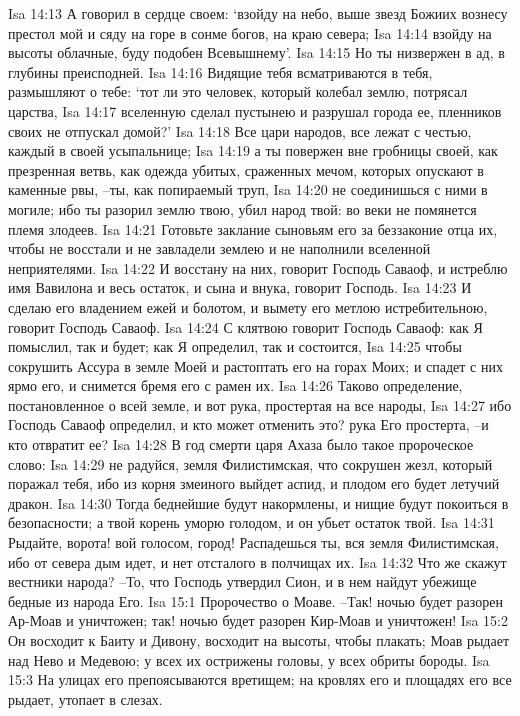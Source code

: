 Isa 14:13  А говорил в сердце своем: `взойду на небо, выше звезд Божиих вознесу престол мой и сяду на горе в сонме богов, на краю севера;
Isa 14:14  взойду на высоты облачные, буду подобен Всевышнему'.
Isa 14:15  Но ты низвержен в ад, в глубины преисподней.
Isa 14:16  Видящие тебя всматриваются в тебя, размышляют о тебе: `тот ли это человек, который колебал землю, потрясал царства,
Isa 14:17  вселенную сделал пустынею и разрушал города ее, пленников своих не отпускал домой?'
Isa 14:18  Все цари народов, все лежат с честью, каждый в своей усыпальнице;
Isa 14:19  а ты повержен вне гробницы своей, как презренная ветвь, как одежда убитых, сраженных мечом, которых опускают в каменные рвы, --ты, как попираемый труп,
Isa 14:20  не соединишься с ними в могиле; ибо ты разорил землю твою, убил народ твой: во веки не помянется племя злодеев.
Isa 14:21  Готовьте заклание сыновьям его за беззаконие отца их, чтобы не восстали и не завладели землею и не наполнили вселенной неприятелями.
Isa 14:22  И восстану на них, говорит Господь Саваоф, и истреблю имя Вавилона и весь остаток, и сына и внука, говорит Господь.
Isa 14:23  И сделаю его владением ежей и болотом, и вымету его метлою истребительною, говорит Господь Саваоф.
Isa 14:24  С клятвою говорит Господь Саваоф: как Я помыслил, так и будет; как Я определил, так и состоится,
Isa 14:25  чтобы сокрушить Ассура в земле Моей и растоптать его на горах Моих; и спадет с них ярмо его, и снимется бремя его с рамен их.
Isa 14:26  Таково определение, постановленное о всей земле, и вот рука, простертая на все народы,
Isa 14:27  ибо Господь Саваоф определил, и кто может отменить это? рука Его простерта, --и кто отвратит ее?
Isa 14:28  В год смерти царя Ахаза было такое пророческое слово:
Isa 14:29  не радуйся, земля Филистимская, что сокрушен жезл, который поражал тебя, ибо из корня змеиного выйдет аспид, и плодом его будет летучий дракон.
Isa 14:30  Тогда беднейшие будут накормлены, и нищие будут покоиться в безопасности; а твой корень уморю голодом, и он убьет остаток твой.
Isa 14:31  Рыдайте, ворота! вой голосом, город! Распадешься ты, вся земля Филистимская, ибо от севера дым идет, и нет отсталого в полчищах их.
Isa 14:32  Что же скажут вестники народа? --То, что Господь утвердил Сион, и в нем найдут убежище бедные из народа Его.
Isa 15:1  Пророчество о Моаве. --Так! ночью будет разорен Ар-Моав и уничтожен; так! ночью будет разорен Кир-Моав и уничтожен!
Isa 15:2  Он восходит к Баиту и Дивону, восходит на высоты, чтобы плакать; Моав рыдает над Нево и Медевою; у всех их острижены головы, у всех обриты бороды.
Isa 15:3  На улицах его препоясываются вретищем; на кровлях его и площадях его все рыдает, утопает в слезах.

